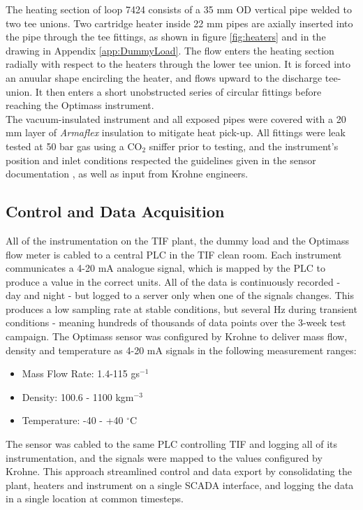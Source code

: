 \documentclass{report}
\begin{document}
\FloatBarrier
The heating section of loop 7424 consists of a 35 mm OD vertical pipe welded to two tee unions. Two cartridge heater inside 22 mm pipes are axially inserted into the pipe through the tee fittings, as shown in figure \ref{fig:heaters} and in the drawing in Appendix \ref{app:DummyLoad}. The flow enters the heating section radially with respect to the heaters through the lower tee union. It is forced into an anuular shape encircling the heater, and flows upward to the discharge tee-union. It then enters a short unobstructed series of circular fittings before reaching the Optimass instrument. \\
The vacuum-insulated instrument and all exposed pipes were covered with a 20 mm layer of \textit{Armaflex} insulation to mitigate heat pick-up. All fittings were leak tested at 50 bar gas using a CO$_2$ sniffer prior to testing, and the instrument's position and inlet conditions respected the guidelines given in the sensor documentation \cite{krohne online}, as well as input from Krohne engineers. 
\FloatBarrier
\subsection{Control and Data Acquisition}
All of the instrumentation on the TIF plant, the dummy load and the Optimass flow meter is cabled to a central PLC in the TIF clean room. Each instrument communicates a 4-20 mA analogue signal, which is mapped by the PLC to produce a value in the correct units. All of the data is continuously recorded - day and night - but logged to a server only when one of the signals changes. This produces a low sampling rate at stable conditions, but several Hz during transient conditions - meaning hundreds of thousands of data points over the 3-week test campaign.
The Optimass sensor was configured by Krohne to deliver mass flow, density and temperature as 4-20 mA signals in the following measurement ranges:\\
\begin{itemize}
\item{Mass Flow Rate: 1.4-115 gs$^{-1}$} 
\item{Density: 100.6 - 1100 kgm$^{-3}$}
\item{Temperature: -40 - +40 $^\circ$C}
\end{itemize}
The sensor was cabled to the same PLC controlling TIF and logging all of its instrumentation, and the signals were mapped to the values configured by Krohne. This approach streamlined control and data export by consolidating the plant, heaters and instrument on a single SCADA interface, and logging the data in a single location at common timesteps. 
\end{document}
